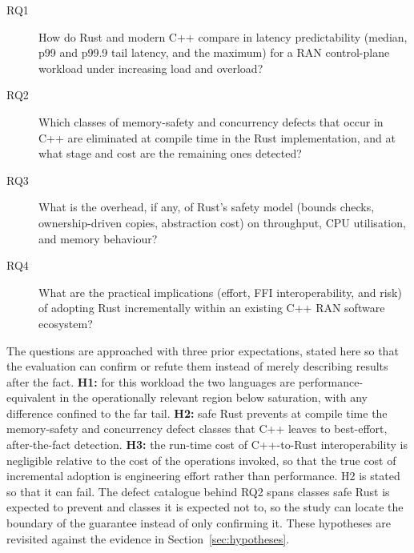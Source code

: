 \documentclass[english,oneside,a4paper,censored,csm,software-track-2020]{HYthesisML}
\begin{document}
\begin{description}
  \item[RQ1] How do Rust and modern C++ compare in latency predictability (median, p99
        and p99.9 tail latency, and the maximum) for a RAN control-plane workload under
        increasing load and overload?
  \item[RQ2] Which classes of memory-safety and concurrency defects that occur in C++ are
        eliminated at compile time in the Rust implementation, and at what stage and cost
        are the remaining ones detected?
  \item[RQ3] What is the overhead, if any, of Rust's safety model (bounds checks,
        ownership-driven copies, abstraction cost) on throughput, CPU utilisation, and
        memory behaviour?
  \item[RQ4] What are the practical implications (effort, FFI interoperability, and risk)
        of adopting Rust incrementally within an existing C++ RAN software ecosystem?
\end{description}

The questions are approached with three prior expectations, stated here so that the evaluation
can confirm or refute them instead of merely describing results after the fact. \textbf{H1:} for
this workload the two languages are performance-equivalent in the operationally relevant region
below saturation, with any difference confined to the far tail. \textbf{H2:} safe Rust prevents
at compile time the memory-safety and concurrency defect classes that C++ leaves to
best-effort, after-the-fact detection. \textbf{H3:} the run-time cost of C++-to-Rust
interoperability is negligible relative to the cost of the operations invoked, so that the true
cost of incremental adoption is engineering effort rather than performance. H2 is stated so that
it can fail. The defect catalogue behind RQ2 spans classes safe Rust is expected to prevent and
classes it is expected not to, so the study can locate the boundary of the guarantee instead of
only confirming it. These hypotheses are revisited against the evidence in
Section~\ref{sec:hypotheses}.
\end{document}
